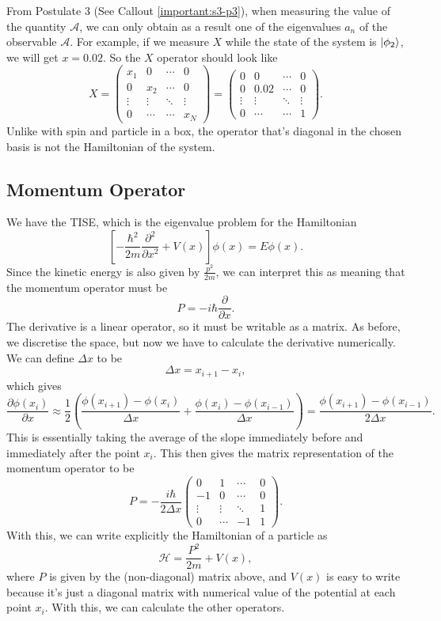 \documentclass{article}
\begin{document}
From Postulate 3 (See Callout \ref{important:s3-p3}), when measuring the value of the quantity $\mathcal{A}$, we can only obtain as a result one of the eigenvalues $a_n$ of the observable $\mathcal{A}$. For example, if we measure $X$ while the state of the system is $\ket{\phi _2}$, we will get $x=0.02$. So the $X$ operator should look like
\[
    X=\begin{pmatrix}
        x_1 & 0 & \cdots & 0 \\
        0 & x_2 & \cdots & 0 \\
        \vdots & \vdots & \ddots & \vdots \\
        0 & \cdots & \cdots & x_N
    \end{pmatrix} =\begin{pmatrix}
        0 & 0 & \cdots & 0\\
        0 & 0.02 & \cdots & 0\\
        \vdots & \vdots & \ddots & \vdots \\
        0 & \cdots & \cdots & 1
    \end{pmatrix}.
\]
Unlike with spin and particle in a box, the operator that's diagonal in the chosen basis is not the Hamiltonian of the system.

\subsection{Momentum Operator}
We have the TISE, which is the eigenvalue problem for the Hamiltonian
\[
    \left[ -\frac{\hbar^2}{2m}\frac{\partial^2}{\partial x^2}+V(x) \right]\phi (x)=E\phi (x).
\]
Since the kinetic energy is also given by $\frac{p^2}{2m}$, we can interpret this as meaning that the momentum operator must be
\[
    P=-i \hbar \frac{\partial }{\partial x}.
\]
The derivative is a linear operator, so it must be writable as a matrix. As before, we discretise the space, but now we have to calculate the derivative numerically. We can define $\Delta x$ to be
\[
    \Delta x=x_{i+1}-x_i,
\]
which gives
\[
    \frac{\partial \phi (x_i)}{\partial x}\approx \frac{1}{2}\left( \frac{\phi (x_{i+1})-\phi (x_i)}{\Delta x}+\frac{\phi (x_i)-\phi (x_{i-1})}{\Delta x} \right)=\frac{\phi (x_{i+1})-\phi (x_{i-1})}{2\Delta x}.
\]
This is essentially taking the average of the slope immediately before and immediately after the point $x_i$. This then gives the matrix representation of the momentum operator to be
\[
    P=-\frac{i \hbar}{2\Delta x}\begin{pmatrix}
        0 & 1 & \cdots & 0\\
        -1 & 0 & \cdots & 0\\
        \vdots & \vdots & \ddots & 1 \\
        0 & \cdots & -1 & 1
    \end{pmatrix}.
\]
With this, we can write explicitly the Hamiltonian of a particle as
\[
    \mathcal{H} = \frac{P^2}{2m}+V(x),
\]
where $P$ is given by the (non-diagonal) matrix above, and $V(x)$ is easy to write because it's just a diagonal matrix with numerical value of the potential at each point $x_i$. With this, we can calculate the other operators.
\end{document}
